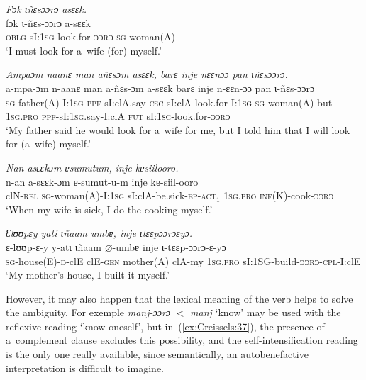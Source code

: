 \documentclass[output=paper]{langscibook}
\begin{document}
  \z
  \z

  \ea\label{ex:Creissels:34}
  
    \ea\label{ex:Creissels:34a}
    
      \textit{Fɔk ɩñɛsɔɔrɔ asɛɛk.}\\
      \gll fɔk ɩ-ñɛs-ɔɔrɔ a-sɛɛk\\
      \textsc{oblg} sI:\textsc{1sg}-look.for-\textsc{ɔɔrɔ} \textsc{sg}-woman(A)\\
      \glt `I must look for a~wife (for) myself.'


    \ex\label{ex:Creissels:34b}
    
      \textit{Ampaɔm naanɛ man añɛsɔm asɛɛk, barɛ inje nɛɛnɔɔ  pan ɩñɛsɔɔrɔ.}\\
      \gll a-mpa-ɔm n-aanɛ man a-ñɛs-ɔm a-sɛɛk barɛ inje n-ɛɛn-ɔɔ pan ɩ-ñɛs-ɔɔrɔ\\
      \textsc{sg}-father(A)-I:\textsc{1sg} \textsc{ppf}-sI:clA.say \textsc{csc}
      sI:clA-look.for-I:\textsc{1sg} \textsc{sg}-woman(A) but \textsc{1sg.pro}
      \textsc{ppf}-sI:\textsc{1sg}.say-I:clA \textsc{fut} sI:\textsc{1sg}-look.for-\textsc{ɔɔrɔ}\\
      \glt `My father said he would look for a~wife for me,
      but I told him that I will look for (a~wife) myself.'

  \z
  \z

  \ea\label{ex:Creissels:35}
  
    \textit{Nan asɛɛkɔm ɐsumutum, inje kɐsiilooro.}\\
    \gll n-an a-sɛɛk-ɔm ɐ-sumut-u-m inje kɐ-siil-ooro\\
    clN-\textsc{rel} \textsc{sg}-woman(A)-I:\textsc{1sg}
    sI:clA-be.sick-\textsc{ep-act$_1$} \textsc{1sg.pro}
    \textsc{inf}(K)-cook-\textsc{ɔɔrɔ}\\
    \glt `When my wife is sick, I do the cooking myself.'
\z

  \ea\label{ex:Creissels:36}
  
    \textit{Ɛlʊʊpɛy yati ɩñaam umbɐ, inje ɩtɛɛpɔɔrɔɛyɔ.}\\
    \gll ɛ-lʊʊp-ɛ-y y-atɩ ɩñaam $\varnothing$-umbɐ inje ɩ-tɛɛp-ɔɔrɔ-ɛ-yɔ\\
    \textsc{sg}-house(E)-\textsc{d}-clE clE-\textsc{gen} mother(A) clA-my
    \textsc{1sg.pro} sI:\textsc{1SG}-build-\textsc{ɔɔrɔ-cpl}-I:clE\\
    \glt `My mother's house, I built it myself.'

\z

However, it may also happen that the lexical meaning of the verb helps to solve
the ambiguity.  For exemple \textit{manj-ɔɔrɔ} $<$ \textit{manj} `know' may be used
with the reflexive reading `know oneself', but in~(\ref{ex:Creissels:37}), the
presence of a~complement clause excludes this possibility, and the
self-intensification reading is the only one really available, since
semantically, an autobenefactive interpretation is difficult to imagine.
\end{document}
